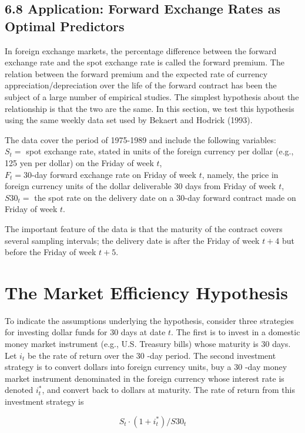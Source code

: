 \documentclass[10pt]{article}
\begin{document}
\subsection*{6.8 Application: Forward Exchange Rates as Optimal Predictors}
In foreign exchange markets, the percentage difference between the forward exchange rate and the spot exchange rate is called the forward premium. The relation between the forward premium and the expected rate of currency appreciation/depreciation over the life of the forward contract has been the subject of a large number of empirical studies. The simplest hypothesis about the relationship is that the two are the same. In this section, we test this hypothesis using the same weekly data set used by Bekaert and Hodrick (1993).

The data cover the period of 1975-1989 and include the following variables:\\
$S_{t}=$ spot exchange rate, stated in units of the foreign currency per dollar (e.g., 125 yen per dollar) on the Friday of week $t$,\\
$F_{t}=30$-day forward exchange rate on Friday of week $t$, namely, the price in foreign currency units of the dollar deliverable 30 days from Friday of week $t$,\\
$S 30_{t}=$ the spot rate on the delivery date on a 30-day forward contract made on Friday of week $t$.

The important feature of the data is that the maturity of the contract covers several sampling intervals; the delivery date is after the Friday of week $t+4$ but before the Friday of week $t+5$.

\section*{The Market Efficiency Hypothesis}
To indicate the assumptions underlying the hypothesis, consider three strategies for investing dollar funds for 30 days at date $t$. The first is to invest in a domestic money market instrument (e.g., U.S. Treasury bills) whose maturity is 30 days. Let $i_{t}$ be the rate of return over the 30 -day period. The second investment strategy is to convert dollars into foreign currency units, buy a 30 -day money market instrument denominated in the foreign currency whose interest rate is denoted $i_{t}^{*}$, and convert back to dollars at maturity. The rate of return from this investment strategy is

$$
S_{t} \cdot\left(1+i_{t}^{*}\right) / S 30_{t}
$$
\end{document}
